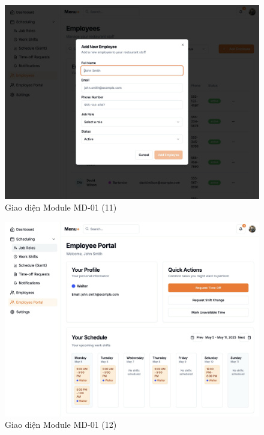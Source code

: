 \begin{figure}[H]
    \centering
    \includegraphics[width=\linewidth]{Sections/hien_thuc/img/1.11.png}
    \vspace{0.5cm}
    \caption{Giao diện Module MD-01 (11)}
    \label{fig:gantt_module_md01_11}
\end{figure}

\begin{figure}[H]
    \centering
    \includegraphics[width=\linewidth]{Sections/hien_thuc/img/1.12.png}
    \vspace{0.5cm}
    \caption{Giao diện Module MD-01 (12)}
    \label{fig:gantt_module_md01_12}
\end{figure}


